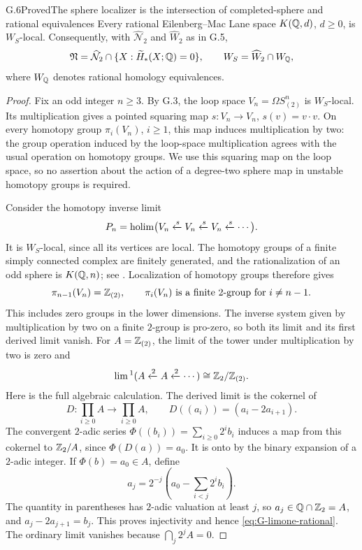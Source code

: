 \begin{claim}{G.6}{Proved}{The sphere localizer is the intersection of completed-sphere and rational equivalences}
Every rational Eilenberg--Mac Lane space $K(\mathbb Q,d)$, $d\geq0$, is $W_S$-local. Consequently, with $\widehat{\mathcal N}_2$ and $\widehat W_2$ as in G.5,
\[
 \mathfrak N=\widehat{\mathcal N}_2\cap
       \{X:\widetilde H_*(X;\mathbb Q)=0\},
 \qquad
 W_S=\widehat W_2\cap W_{\mathbb Q},
\]
where $W_{\mathbb Q}$ denotes rational homology equivalences.
\end{claim}
\begin{proof}
Fix an odd integer $n\geq3$. By G.3, the loop space $V_n=\Omega S^n_{(2)}$ is $W_S$-local. Its multiplication gives a pointed squaring map $s:V_n\to V_n$, $s(v)=v\cdot v$. On every homotopy group $\pi_i(V_n)$, $i\geq1$, this map induces multiplication by two: the group operation induced by the loop-space multiplication agrees with the usual operation on homotopy groups. We use this squaring map on the loop space, so no assertion about the action of a degree-two sphere map in unstable homotopy groups is required.

Consider the homotopy inverse limit
\[
 P_n=\operatorname*{holim}\bigl(V_n\xleftarrow{s}V_n\xleftarrow{s}V_n\xleftarrow{s}\cdots\bigr).
\]
It is $W_S$-local, since all its vertices are local. The homotopy groups of a finite simply connected complex are finitely generated, and the rationalization of an odd sphere is $K(\mathbb Q,n)$; see \cite[Theorem 4.5.2 and Corollary 6.7.3]{FGHMayPonto2012}. Localization of homotopy groups therefore gives
\[
 \pi_{n-1}(V_n)=\mathbb Z_{(2)},
 \qquad
 \pi_i(V_n)\text{ is a finite }2\text{-group for }i\ne n-1.
\]
This includes zero groups in the lower dimensions. The inverse system given by multiplication by two on a finite $2$-group is pro-zero, so both its limit and its first derived limit vanish. For $A=\mathbb Z_{(2)}$, the limit of the tower under multiplication by two is zero and
\begin{equation}\label{eq:G-limone-rational}
 \lim{}^1(A\xleftarrow{2}A\xleftarrow{2}\cdots)
       \cong \mathbb Z_2/\mathbb Z_{(2)}.
\end{equation}
Here is the full algebraic calculation. The derived limit is the cokernel of
\[
 D:\prod_{i\geq0}A\longrightarrow\prod_{i\geq0}A,
 \qquad D((a_i))=(a_i-2a_{i+1}).
\]
The convergent $2$-adic series
$\Phi((b_i))=\sum_{i\geq0}2^i b_i$
induces a map from this cokernel to $\mathbb Z_2/A$, since
$\Phi(D(a))=a_0$. It is onto by the binary expansion of a $2$-adic integer. If $\Phi(b)=a_0\in A$, define
\[
 a_j=2^{-j}\left(a_0-\sum_{i<j}2^i b_i\right).
\]
The quantity in parentheses has $2$-adic valuation at least $j$, so $a_j\in\mathbb Q\cap\mathbb Z_2=A$, and $a_j-2a_{j+1}=b_j$. This proves injectivity and hence \eqref{eq:G-limone-rational}. The ordinary limit vanishes because $\bigcap_j2^j A=0$.


\end{proof}

